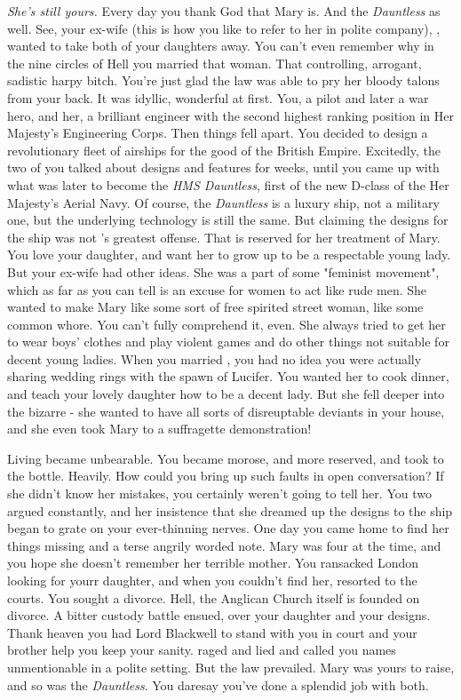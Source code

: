 \documentclass[char]{guildcamp1}
\begin{document}
{\it She's still yours.} Every day you thank God that Mary is. And the
{\it Dauntless} as well. See, your ex-wife (this is how you like to
refer to her in polite company), \cCurie{\intro}, wanted to take both
of your daughters away. You can't even remember why in the nine
circles of Hell you married that woman. That controlling, arrogant,
sadistic harpy bitch. You're just glad the law was able to pry her
bloody talons from your back. It was idyllic, wonderful at first. You,
a pilot and later a war hero, and her, a brilliant engineer with the
second highest ranking position in Her Majesty's Engineering
Corps. Then things fell apart. You decided to design a revolutionary
fleet of airships for the good of the British Empire. Excitedly, the
two of you talked about designs and features for weeks, until you came
up with what was later to become the {\it HMS Dauntless}, first of the
new D-class of the Her Majesty's Aerial Navy. Of course, the {\it
Dauntless} is a luxury ship, not a military one, but the underlying
technology is still the same. But claiming the designs for the ship
was not \cCurie{}'s greatest offense. That is reserved for her
treatment of Mary. You love your daughter, and want her to grow up to
be a respectable young lady. But your ex-wife had other ideas. She was
a part of some "feminist movement", which as far as you can tell is an
excuse for women to act like rude men. She wanted to make Mary like
some sort of free spirited street woman, like some common whore. You
can't fully comprehend it, even. She always tried to get her to wear
boys' clothes and play violent games and do other things not suitable
for decent young ladies. When you married \cCurie{}, you had no idea
you were actually sharing wedding rings with the spawn of Lucifer. You
wanted her to cook dinner, and teach your lovely daughter how to be a
decent lady. But she fell deeper into the bizarre - she wanted to have
all sorts of disreuptable deviants in your house, and she even took
Mary to a suffragette demonstration!

Living became unbearable. You became morose, and more reserved, and
took to the bottle. Heavily. How could you bring up such faults in
open conversation? If she didn't know her mistakes, you certainly
weren't going to tell her. You two argued constantly, and her
insistence that she dreamed up the designs to the ship began to grate
on your ever-thinning nerves. One day you came home to find her things
missing and a terse angrily worded note. Mary was four at the time,
and you hope she doesn't remember her terrible mother. You ransacked
London looking for yourr daughter, and when you couldn't find her,
resorted to the courts. You sought a divorce. Hell, the Anglican
Church itself is founded on divorce. A bitter custody battle ensued,
over your daughter and your designs. Thank heaven you had Lord
Blackwell to stand with you in court and your brother help you keep
your sanity. \cCurie{} raged and lied and called you names
unmentionable in a polite setting. But the law prevailed. Mary was
yours to raise, and so was the {\it Dauntless}. You daresay you've
done a splendid job with both. 
\end{document}
